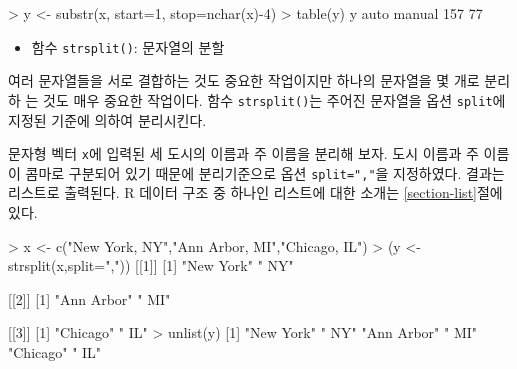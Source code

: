 \documentclass[
]{book}
\newenvironment{Shaded}{\begin{snugshade}}{\end{snugshade}}
\newcommand{\AttributeTok}[1]{\textcolor[rgb]{0.77,0.63,0.00}{#1}}
\newcommand{\DecValTok}[1]{\textcolor[rgb]{0.00,0.00,0.81}{#1}}
\newcommand{\FunctionTok}[1]{\textcolor[rgb]{0.00,0.00,0.00}{#1}}
\newcommand{\NormalTok}[1]{#1}
\newcommand{\OtherTok}[1]{\textcolor[rgb]{0.56,0.35,0.01}{#1}}
\newcommand{\SpecialCharTok}[1]{\textcolor[rgb]{0.00,0.00,0.00}{#1}}
\newcommand{\StringTok}[1]{\textcolor[rgb]{0.31,0.60,0.02}{#1}}
\providecommand{\tightlist}{%
  \setlength{\itemsep}{0pt}\setlength{\parskip}{0pt}}
\begin{document}
\begin{Shaded}
\begin{Highlighting}[]
\SpecialCharTok{\textgreater{}}\NormalTok{ y }\OtherTok{\textless{}{-}} \FunctionTok{substr}\NormalTok{(x, }\AttributeTok{start=}\DecValTok{1}\NormalTok{, }\AttributeTok{stop=}\FunctionTok{nchar}\NormalTok{(x)}\SpecialCharTok{{-}}\DecValTok{4}\NormalTok{)}
\SpecialCharTok{\textgreater{}} \FunctionTok{table}\NormalTok{(y)}
\NormalTok{y}
\NormalTok{  auto manual }
   \DecValTok{157}     \DecValTok{77} 
\end{Highlighting}
\end{Shaded}

\begin{itemize}
\tightlist
\item
  함수 \texttt{strsplit()}: 문자열의 분할
\end{itemize}

여러 문자열들을 서로 결합하는 것도 중요한 작업이지만 하나의 문자열을 몇 개로 분리하
는 것도 매우 중요한 작업이다. 함수 \texttt{strsplit()}는 주어진 문자열을 옵션 \texttt{split}에 지정된 기준에 의하여 분리시킨다.

문자형 벡터 \texttt{x}에 입력된 세 도시의 이름과 주 이름을 분리해 보자. 도시 이름과 주 이름
이 콤마로 구분되어 있기 때문에 분리기준으로 옵션 \texttt{split=","}을 지정하였다. 결과는 리스트로 출력된다. R 데이터 구조 중 하나인 리스트에 대한 소개는 \ref{section-list}절에 있다.

\begin{Shaded}
\begin{Highlighting}[]
\SpecialCharTok{\textgreater{}}\NormalTok{ x }\OtherTok{\textless{}{-}} \FunctionTok{c}\NormalTok{(}\StringTok{"New York, NY"}\NormalTok{,}\StringTok{"Ann Arbor, MI"}\NormalTok{,}\StringTok{"Chicago, IL"}\NormalTok{)}
\SpecialCharTok{\textgreater{}}\NormalTok{ (y }\OtherTok{\textless{}{-}} \FunctionTok{strsplit}\NormalTok{(x,}\AttributeTok{split=}\StringTok{","}\NormalTok{))}
\NormalTok{[[}\DecValTok{1}\NormalTok{]]}
\NormalTok{[}\DecValTok{1}\NormalTok{] }\StringTok{"New York"} \StringTok{" NY"}     

\NormalTok{[[}\DecValTok{2}\NormalTok{]]}
\NormalTok{[}\DecValTok{1}\NormalTok{] }\StringTok{"Ann Arbor"} \StringTok{" MI"}      

\NormalTok{[[}\DecValTok{3}\NormalTok{]]}
\NormalTok{[}\DecValTok{1}\NormalTok{] }\StringTok{"Chicago"} \StringTok{" IL"}    
\SpecialCharTok{\textgreater{}} \FunctionTok{unlist}\NormalTok{(y)}
\NormalTok{[}\DecValTok{1}\NormalTok{] }\StringTok{"New York"}  \StringTok{" NY"}       \StringTok{"Ann Arbor"} \StringTok{" MI"}       \StringTok{"Chicago"}   \StringTok{" IL"}      
\end{Highlighting}
\end{Shaded}
\end{document}
